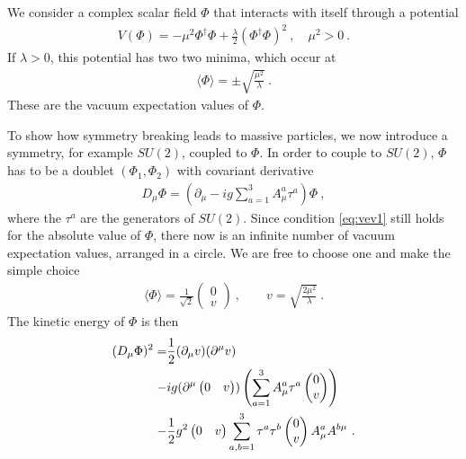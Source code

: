 We consider a complex scalar field $\Phi$ that interacts with itself through a potential
\begin{align}
	V(\Phi) = -\mu^2\Phi^\dagger\Phi + \frac{\lambda}{2}(\Phi^\dagger\Phi)^2 \ , \quad \mu^2 > 0 \ .
\end{align}
If $\lambda>0$, this potential has two two minima, which occur at
\begin{align}\label{eq:vev1}
	\langle\Phi\rangle =  \pm\sqrt{\frac{\mu^2}{\lambda}} \ .
\end{align}
These are the vacuum expectation values of $\Phi$.

To show how symmetry breaking leads to massive particles, we now introduce a symmetry, for example $SU(2)$, coupled to $\Phi$. In order to couple to $SU(2)$, $\Phi$ has to be a doublet $(\Phi_1,\Phi_2)$ with covariant derivative
\begin{align}
	D_\mu\Phi = (\partial_\mu - ig\sum_{a=1}^3A_\mu^a\tau^a)\Phi \ ,
\end{align}
where the $\tau^a$ are the generators of $SU(2)$. Since condition \eqref{eq:vev1} still holds for the absolute value of $\Phi$, there now is an infinite number of vacuum expectation values, arranged in a circle. We are free to choose one and make the simple choice
\begin{align}\label{eq:vev2}
	\langle\Phi\rangle = \frac{1}{\sqrt{2}}\begin{pmatrix} 0 \\ v \end{pmatrix} \ , \qquad v = \sqrt{\frac{2\mu^2}{\lambda}} \ .
\end{align}
The kinetic energy of $\Phi$ is then
\begin{align}\label{eq:Ekin}
	(D_\mu\Phi)^2 = &\frac{1}{2}(\partial_\mu v)(\partial^\mu v)\notag \\
	- &ig(\partial^\mu\begin{pmatrix} 0 & v \end{pmatrix}) \left(\sum_{a=1}^3A_\mu^a\tau^a\begin{pmatrix} 0 \\ v \end{pmatrix}\right)\notag \\
	- &\frac{1}{2}g^2\begin{pmatrix} 0 & v \end{pmatrix}\sum_{a,b=1}^{3}\tau^a\tau^b\begin{pmatrix} 0 \\ v \end{pmatrix}A_\mu^aA^{b\mu} \ .
\end{align}
